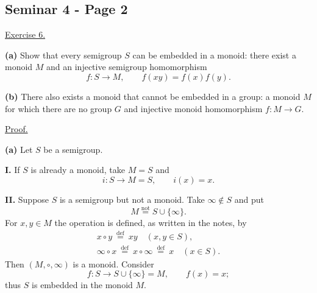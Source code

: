 
\subsection*{Seminar 4 - Page 2}

\noindent\underline{Exercise 6.}

\noindent\textbf{(a)} Show that every semigroup $S$ can be embedded in a
monoid: there exist a monoid $M$ and an injective semigroup
homomorphism
\[
  f:S\longrightarrow M, \qquad f(xy)=f(x)f(y).
\]

\noindent\textbf{(b)} There also exists a monoid that cannot be embedded
in a group: a monoid $M$ for which there are no group $G$ and
injective monoid homomorphism $f:M\to G$.

\medskip
\noindent\underline{Proof.}

\noindent\textbf{(a)} Let $S$ be a semigroup.

\smallskip
\noindent\textbf{I.} If $S$ is already a monoid, take $M=S$ and
\[
  i:S\longrightarrow M=S,\qquad i(x)=x.
\]

\noindent\textbf{II.} Suppose $S$ is a semigroup but not a monoid.
Take $\infty\notin S$ and put
\[
  M\overset{\mathrm{not}}{=}S\cup\{\infty\}.
\]
For $x,y\in M$ the operation is defined, as written in the notes, by
\[
\begin{gathered}
  x\circ y\ \overset{\mathrm{def}}{=}\ xy
     \quad(x,y\in S),\\
  \infty\circ x\ \overset{\mathrm{def}}{=}\
     x\circ\infty\ \overset{\mathrm{def}}{=}\ x
     \quad(x\in S).
\end{gathered}
\]
Then $(M,\circ,\infty)$ is a monoid. Consider
\[
  f:S\longrightarrow S\cup\{\infty\}=M,\qquad f(x)=x;
\]
thus $S$ is embedded in the monoid $M$.

